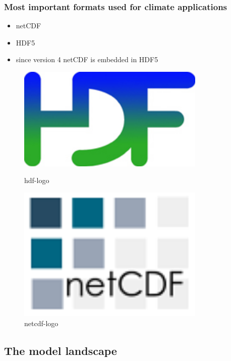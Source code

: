 \documentclass[compress]{beamer}
\begin{document}
\begin{frame}[fragile]
	\frametitle{Most important formats used for climate applications}

		\begin{itemize}
			\item netCDF
			\item HDF5
			\item since version 4 netCDF is embedded in HDF5
		\end{itemize}

  \begin{figure}[htbp]
    \begin{minipage}{0.35\textwidth}
     \centering
      \includegraphics[width=0.8\textwidth]{gfx/hdf.jpg}
      \caption{hdf-logo \cite{hdf}}
    \end{minipage}\hfill
    \begin{minipage}{0.35\textwidth}
     \centering
      \includegraphics[width=0.8\textwidth]{gfx/netcdf.png}
      \caption{netcdf-logo \cite{netcdf}}
    \end{minipage}
  \end{figure}

\end{frame}


\subsection{The model landscape}
\end{document}
